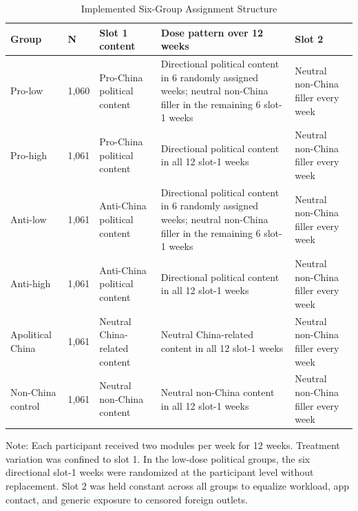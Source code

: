 \begin{table}[H]
\centering
\begin{threeparttable}
\caption{Implemented Six-Group Assignment Structure}
\label{tab:treatment_structure}
\scriptsize
\setlength{\tabcolsep}{4pt}
\begin{tabularx}{\textwidth}{p{2.8cm} p{1.6cm} X X p{1.8cm}}
\toprule
\textbf{Group} & \textbf{N} & \textbf{Slot 1 content} & \textbf{Dose pattern over 12 weeks} & \textbf{Slot 2} \\
\midrule
Pro-low & 1,060 & Pro-China political content & Directional political content in 6 randomly assigned weeks; neutral non-China filler in the remaining 6 slot-1 weeks & Neutral non-China filler every week \\
\addlinespace
Pro-high & 1,061 & Pro-China political content & Directional political content in all 12 slot-1 weeks & Neutral non-China filler every week \\
\addlinespace
Anti-low & 1,061 & Anti-China political content & Directional political content in 6 randomly assigned weeks; neutral non-China filler in the remaining 6 slot-1 weeks & Neutral non-China filler every week \\
\addlinespace
Anti-high & 1,061 & Anti-China political content & Directional political content in all 12 slot-1 weeks & Neutral non-China filler every week \\
\addlinespace
Apolitical China & 1,061 & Neutral China-related content & Neutral China-related content in all 12 slot-1 weeks & Neutral non-China filler every week \\
\addlinespace
Non-China control & 1,061 & Neutral non-China content & Neutral non-China content in all 12 slot-1 weeks & Neutral non-China filler every week \\
\bottomrule
\end{tabularx}
\begin{tablenotes}[flushleft]
\footnotesize
\item Note: Each participant received two modules per week for 12 weeks. Treatment variation was confined to slot 1. In the low-dose political groups, the six directional slot-1 weeks were randomized at the participant level without replacement. Slot 2 was held constant across all groups to equalize workload, app contact, and generic exposure to censored foreign outlets.
\end{tablenotes}
\end{threeparttable}
\end{table}
